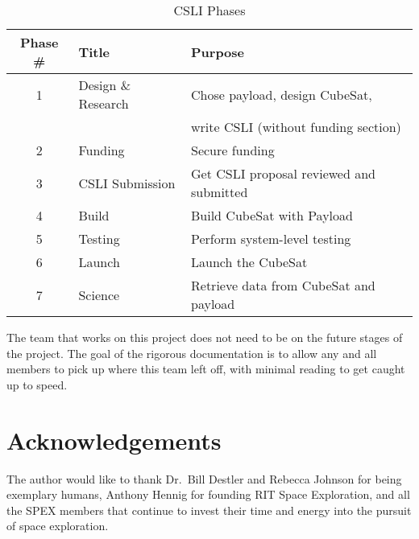 \documentclass[conference]{IEEEtran} %
\begin{document}
\begin{table}[h!]
    \caption{CSLI Phases}
    \centering
    \begin{tabular}{@{}cll@{}}
    \toprule
    Phase \# & Title & Purpose \\
    \midrule
    1 & Design \& Research & Chose payload, design CubeSat, \\
      &                    & write CSLI (without funding section) \\
    2 & Funding & Secure funding \\
    3 & CSLI Submission & Get CSLI proposal reviewed and submitted \\
    4 & Build & Build CubeSat with Payload \\
    5 & Testing & Perform system-level testing \\
    6 & Launch & Launch the CubeSat \\
    7 & Science & Retrieve data from CubeSat and payload \\
    \bottomrule
    \end{tabular}
\label{tab:phases}
\end{table}

The team that works on this project does not need to be on the future stages of the project. The goal of the rigorous documentation is to allow any and all members
to pick up where this team left off, with minimal reading to get caught up to speed.
\section*{Acknowledgements}
The author would like to thank Dr.~Bill Destler and Rebecca Johnson for being exemplary humans, Anthony Hennig for founding RIT Space Exploration, and all the SPEX members that continue to invest their time and energy into the pursuit of space exploration.

%
%

\onecolumn
\appendices{}
\end{document}
